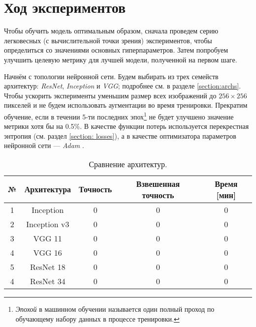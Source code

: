 \section{Ход экспериментов}

\indent
\indent
Чтобы обучить модель оптимальным образом, сначала проведем серию
легковесных (с вычислительной точки зрения) экспериментов, чтобы определиться 
со значениями основных гиперпараметров. Затем попробуем улучшить целевую метрику
для лучшей модели, полученной на первом шаге.

\indent
\indent
Начнём с топологии нейронной сети. Будем выбирать из трех семейств архитектур:
 \textit{ResNet}, \textit{Inception} и \textit{VGG}; подробнее см. в разделе \ref{section:archs}.
Чтобы ускорить эксперименты уменьшим размер всех изображений до
$256 \times 256$ пикселей и не будем использовать аугментации во время тренировки.
Прекратим обучение, если в течении 5-ти последних 
эпох\footnote{\textit{Эпохой} в машинном обучении называется один полный проход по
обучающему набору данных в процессе тренировки.} 
не будет улучшено 
значение метрики хотя бы на 0.5\%. В качестве функции потерь используется перекрестная
энтропия (см. раздел \ref{section: losses}), а в качестве оптимизатора параметров 
нейронной сети --- \textit{Adam} \cite{adam}.


\begin{table}[h]
    \begin{center}
        \begin{tabular}{c | c| c | c | c}
            \hline
            № & Архитектура & Точность & Взвешенная точность  & Время [мин] \\
            \hline
    
            1 & Inception & 0 & 0 & 0 \\
            
            2 & Inception v3 & 0 & 0 & 0 \\
            
            3 & VGG 11 & 0 & 0 & 0 \\
            
            4 & VGG 16 & 0 & 0 & 0 \\
            
            5 & ResNet 18 & 0 & 0 & 0 \\
            
            4 & ResNet 34 & 0 & 0 & 0 \\
    
            \hline
        \end{tabular}
    \end{center}
    \caption{Сравнение архитектур.}
    \label{tabular: mapping}
\end{table}


